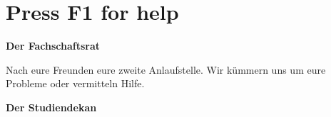 \section{Press F1 for help}

\textbf{Der Fachschaftsrat}

Nach eure Freunden eure zweite Anlaufstelle. Wir kümmern uns um eure Probleme oder vermitteln Hilfe.

\textbf{Der Studiendekan}
